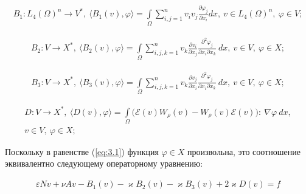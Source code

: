 \begin{equation*}
    \begin{gathered}
        B_1: L_4(\Omega)^n \rightarrow V^*
        , \ \langle B_1(v), \varphi \rangle = \int\limits_\Omega \sum_{i,j=1}^n v_i v_j \frac{\partial \varphi_j}{\partial x_i} dx
        , \ v \in L_4(\Omega)^n, \ \varphi \in V;
    \end{gathered}
\end{equation*}

\begin{equation*}
    \begin{gathered}
        B_2: V \rightarrow X^*
        , \ \langle B_2(v), \varphi \rangle = \int\limits_\Omega \sum_{i,j,k=1}^n v_k \frac{\partial v_i}{\partial x_j}
        \frac{\partial^2 \varphi_j}{\partial x_i \partial x_k} \ dx
        , \ v \in V, \ \varphi \in X;
    \end{gathered}
\end{equation*}

\begin{equation*}
    \begin{gathered}
        B_3: V \rightarrow X^*
        , \ \langle B_3(v), \varphi \rangle = \int\limits_\Omega \sum_{i,j,k=1}^n v_k \frac{\partial v_j}{\partial x_i}
        \frac{\partial^2 \varphi_j}{\partial x_i \partial x_k} \ dx
        , \ v \in V, \ \varphi \in X;
    \end{gathered}
\end{equation*}

\begin{equation*}
    \begin{gathered}
        D: V \rightarrow X^*
        , \ \langle D(v), \varphi \rangle = \int\limits_\Omega \bigg(\mathcal{E}(v) W_\rho (v) - W_\rho (v) \mathcal{E}(v)\bigg): \ \nabla \varphi \ dx, \\
        v \in V, \ \varphi \in X;
    \end{gathered}
\end{equation*}

Поскольку в равенстве (\ref{eq:3.1}) функция $\varphi \in X$ произвольна, это соотношение эквивалентно следующему операторному уравнению:

\begin{equation}\label{eq:3.2}
    \begin{gathered}
        \varepsilon N v + \nu A v - B_1(v) - \varkappa B_2(v) - \varkappa B_3(v) + 2 \varkappa D(v) = f
    \end{gathered}
\end{equation}

